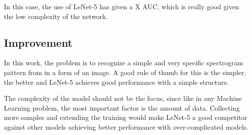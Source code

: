 \documentclass[]{article}
\begin{document}
In this case, the use of LeNet-5 has given a X AUC, which is really good given the low complexity of the network. 
\subsection{Improvement}\label{improvement}


In this work, the problem is to recognize a simple and very specific spectrogram pattern from in a form of an image. A good rule of thumb for this is the simpler, the better and LeNet-5 achieves good performance with a simple structure.  

The complexity of the model should not be the focus, since like in any Machine Learning problem, the most important factor is the amount of data. Collecting more samples and extending the training would make LeNet-5 a good competitor against other models achieving better performance with over-complicated models.
\end{document}
